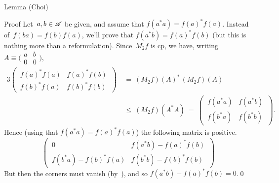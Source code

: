 \documentclass[a]{subfiles}
\begin{document}
\begin{parsec}
\begin{point}[choi]{Lemma (Choi)}
\begin{point}{Proof}
Let~$a,b\in \mathscr{A}$ be given,
and assume that $f(a^*a)=f(a)^*f(a)$.
Instead of~$f(ba)=f(b)f(a)$,
we'll prove that $f(a^*b)=f(a)^*f(b)$
(but this is nothing more than  a reformulation).
Since~$M_2f$ is cp,
we have, writing 
$A\equiv\bigl(\begin{smallmatrix}a&b\\0&0\end{smallmatrix}\bigr)$,
\begin{alignat*}{3}
\left(\,\begin{matrix}f(a)^*f(a)&f(a)^*f(b)\\
f(b)^*f(a)&f(b)^*f(b)\end{matrix}\,\right) 
	\ &=\ (M_2f)(A)^*\,(M_2f)(A)\\
\ &\leq\ (M_2f)(A^*A) \ =\ 
\left(\,\begin{matrix}f(a^*a)&f(a^*b)\\
f(b^*a)&f(b^*b)\end{matrix}\,\right).
\end{alignat*}
Hence
(using that $f(a^*a)=f(a)^*f(a)$)
the following matrix is positive.
\begin{equation*}
\left(\,\begin{matrix}
0 & f(a^*b) - f(a)^*f(b) \\
f(b^*a)-f(b)^*f(a) & f(b^*b)-f(b)^*f(b)
\end{matrix}\,\right)
\end{equation*}
But then
the corners must vanish
(by~),
and so
$f(a^*b)-f(a)^*f(b)=0$.\qed
\end{point}
\end{point}
\end{parsec}
\end{document}
